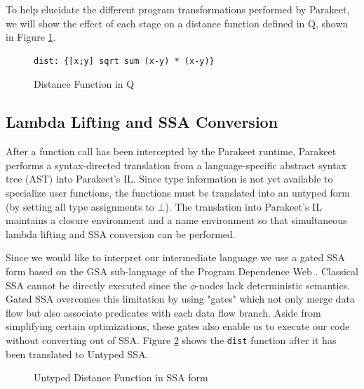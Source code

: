 \documentclass[preprint]{sigplanconf}
\begin{document}
To help elucidate the different program transformations performed by Parakeet,
we will show the effect of each stage on a distance function defined in Q,
shown in Figure \ref{QDist}.

\begin{figure}[h!]
    \begin{lstlisting}[numbers=none]
    dist: {[x;y] sqrt sum (x-y) * (x-y)}
    \end{lstlisting}
    \caption{Distance Function in Q}
    \label{QDist}
\end{figure}

\subsection{Lambda Lifting and SSA Conversion } 
After a function call has been
intercepted by the Parakeet runtime, Parakeet
performs a syntax-directed translation from a
language-specific abstract syntax tree (AST) into Parakeet's IL. 
Since type information is not yet
available to specialize user functions, the
functions must be translated into an untyped
form (by setting all type assignments to $\bot$). The translation into
Parakeet's IL maintains a closure environment and a name environment so that
simultaneous lambda lifting and SSA conversion can be performed.

Since we would like to interpret our intermediate language we use a gated SSA
form based on the GSA sub-language of the Program Dependence Web \cite{Ott90}.
Classical SSA cannot be directly executed since the $\phi$-nodes lack
deterministic semantics. Gated SSA overcomes this limitation by using "gates"
which not only merge data flow but also associate predicates with each data flow
branch. Aside from simplifying certain optimizations, these gates also enable us
to execute our code without converting out of SSA.  Figure \ref{UntypedSSADist}
shows the \texttt{dist} function after it has been translated to Untyped SSA.

\begin{figure}[h!]
\caption{Untyped Distance Function in SSA form}
\label{UntypedSSADist}
\end{figure}
\end{document}
